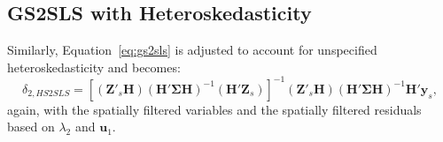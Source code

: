 \documentclass{article}
\begin{document}
\subsection{GS2SLS with Heteroskedasticity}
Similarly, Equation~\ref{eq:gs2sls} is adjusted to account for unspecified heteroskedasticity
and becomes:
\begin{equation*}
\delta_{2,HS2SLS} = [ ( \mathbf{Z'}_s \mathbf{H} )(\mathbf{H' \Sigma H})^{-1} ( \mathbf{H'} \mathbf{Z}_s ) ]^{-1} ( \mathbf{Z'}_s \mathbf{H} ) (\mathbf{H' \Sigma H})^{-1} \mathbf{H'} \mathbf{y}_s,
\end{equation*}
again, with the spatially filtered variables and the spatially filtered residuals based on $\lambda_2$
and $\mathbf{u}_1$.



\end{document}

